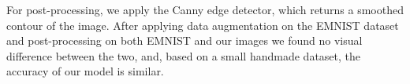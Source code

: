 \documentclass[12pt, a4paper]{report}
\begin{document}
For post-processing, we apply the Canny edge detector, which returns a smoothed contour of the image. After applying data augmentation on the EMNIST dataset and post-processing on both EMNIST and our images we found no visual difference between the two, and, based on a small handmade dataset, the accuracy of our model is similar.
 


\begin{figure}[!h]
	\begin{center}
		\hspace{1cm}
		\\

\end{center}
\end{figure}
\end{document}
